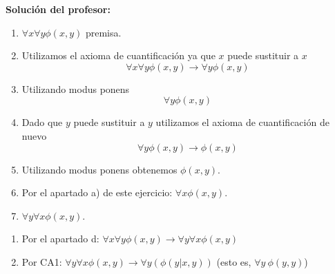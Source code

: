 \begin{problem}
\textbf{Solución del profesor:}
\begin{enumerate}
	\item $\forall x\forall y \phi(x,y)$ premisa.
	\item Utilizamos el axioma de cuantificación ya que $x$ puede sustituir a $x$
	$$\forall x\forall y \phi(x,y) \to \forall y\phi (x,y)$$
	\item Utilizando modus ponens
	$$\forall y \phi(x,y)$$
	\item Dado que $y$ puede sustituir a $y$ utilizamos el axioma de cuantificación de nuevo
	$$\forall y\phi(x,y) \to \phi(x,y)$$
	\item Utilizando modus ponens obtenemos $\phi(x,y)$.
	\item Por el apartado a) de este ejercicio: $\forall x \phi(x,y)$.
	\item $\forall y \forall x \phi(x,y)$.
\end{enumerate}

\spart


\begin{enumerate}
	\item Por el apartado d: $ \forall x \forall y \phi (x,y) \to \forall y \forall x \phi (x,y)$
	\item Por CA1: $\forall y \forall x \phi (x,y) \to \forall y (\phi (y|x, y))$ (esto es, $\forall y~\phi (y,y)$)
\end{enumerate}

\end{problem}